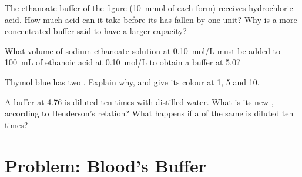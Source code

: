 \begin{exercise}[$\star\star\star$]\label{exo:g12:buffers-predominance:12}
The ethanoate buffer of the figure (\qty{10}{mmol} of each form) receives
hydrochloric acid. How much acid can it take before its  has fallen by
one unit? Why is a more concentrated buffer said to have a larger
capacity?
\end{exercise}

\begin{exercise}[$\star\star\star$]\label{exo:g12:buffers-predominance:13}
What volume of sodium ethanoate solution at \qty{0.10}{mol/L} must be
added to \qty{100}{mL} of ethanoic acid at \qty{0.10}{mol/L} to obtain a
buffer at  5.0?
\end{exercise}

\begin{exercise}[$\star\star\star$]\label{exo:g12:buffers-predominance:14}
Thymol blue has two . Explain why, and give its
colour at  1, 5 and 10.
\end{exercise}

\begin{exercise}[$\star\star\star$]\label{exo:g12:buffers-predominance:15}
A buffer at  4.76 is diluted ten times with distilled water. What is
its new , according to Henderson's relation? What happens if a  of the same  is diluted ten times?
\end{exercise}

\section{Problem: Blood's Buffer}

